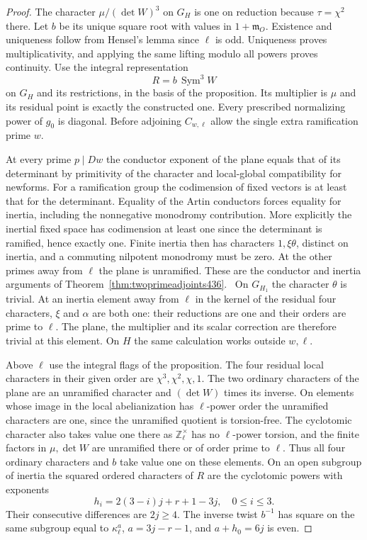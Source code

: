 \documentclass[a4paper,11pt]{article}
\theoremstyle{definition}
\theoremstyle{remark}
\newcommand{\ZZ}{\mathbb Z}\newcommand{\ord}{\operatorname{ord}}
\numberwithin{equation}{section}
\begin{document}
\begin{proof}
The character \(\mu/(\det W)^3\) on \(G_H\) is one on
reduction because \(\tau=\chi^2\) there. Let \(b\) be its
unique square root with values in \(1+\mathfrak m_O\).
Existence and uniqueness follow from Hensel's lemma since
\(\ell\) is odd. Uniqueness proves multiplicativity, and
applying the same lifting modulo all powers proves continuity.
Use the integral representation
\[
               R=b\,\operatorname{Sym}^3 W
\]
on \(G_H\) and its restrictions, in the basis of the
proposition. Its multiplier is \(\mu\) and its residual
point is exactly the constructed one. Every prescribed
normalizing power of \(g_0\) is diagonal. Before adjoining
\(C_{w,\ell}\) allow the single extra ramification prime \(w\).

At every prime \(p\mid Dw\) the conductor exponent of the
plane equals that of its determinant by primitivity of the
character and local-global compatibility for newforms.
For a ramification group the codimension of fixed vectors
is at least that for the determinant. Equality of the Artin
conductors forces equality for inertia, including the
nonnegative monodromy contribution. More explicitly the
inertial fixed space has codimension at least one since the
determinant is ramified, hence exactly one. Finite inertia
then has characters \(1,\xi\theta\), distinct on inertia,
and a commuting nilpotent monodromy must be zero. At the
other primes away from \(\ell\) the plane is unramified.
These are the conductor and inertia arguments of
Theorem~\ref{thm:twoprimeadjoints436}.~\cite{XII-IX-VI-saito40}
On \(G_{H_1}\) the character \(\theta\) is trivial. At an
inertia element away from \(\ell\) in the kernel of the
residual four characters, \(\xi\) and \(\alpha\) are both
one: their reductions are one and their orders are prime
to \(\ell\). The plane, the multiplier and its scalar
correction are therefore trivial at this element. On \(H\)
the same calculation works outside \(w,\ell\).

Above \(\ell\) use the integral flags of the proposition.
The four residual local characters in their given order are
\(\chi^3,\chi^2,\chi,1\). The two ordinary characters of
the plane are an unramified character and
\((\det W)\) times its inverse. On elements whose image in
the local abelianization has \(\ell\)-power order the
unramified characters are one, since the unramified quotient
is torsion-free. The cyclotomic character also takes value
one there as \(\ZZ_\ell^\times\) has no \(\ell\)-power torsion,
and the finite factors in \(\mu,\det W\) are unramified
there or of order prime to \(\ell\). Thus all four ordinary
characters and \(b\) take value one on these elements. On
an open subgroup of inertia the squared ordered characters
of \(R\) are the cyclotomic powers with exponents
\[
      h_i=2(3-i)j+r+1-3j,\quad 0\le i\le3 .
\]
Their consecutive differences are \(2j\ge4\). The inverse
twist \(b^{-1}\) has square on the same subgroup equal to
\(\kappa_\ell^{a}\), \(a=3j-r-1\), and \(a+h_0=6j\) is even.


\end{proof}
\end{document}
